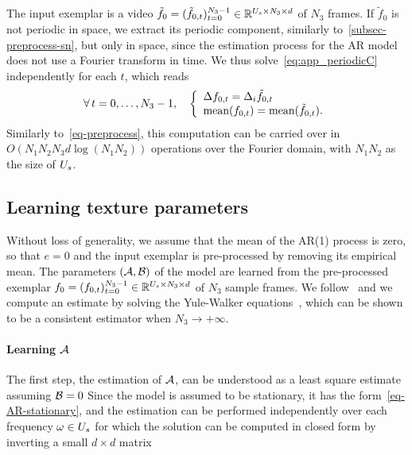 The input exemplar is a video $\tilde f_0 = (\tilde f_{0,t})_{t=0}^{N_3-1} \in \mathbb{R}^{U_s \times N_3 \times d}$ of $N_3$ frames. If $\tilde f_0$ is not periodic in space, we extract its periodic component, similarly to~\eqref{subsec-preprocess-sn}, but only in space, since the estimation process for the AR model does not use a Fourier transform in time. We thus solve~\eqref{eq:app_periodicC} independently for each $t$, which reads
\begin{align}
	\foralls t=0,\ldots,N_3-1, \quad
	\left\{
	\begin{array}{ll}
 		\Delta f_{0,t} = \Delta_i \tilde f_{0,t} \\
		 \textrm{mean}(f_{0,t}) = \textrm{mean}(\tilde f_{0,t}).
	\end{array}
	\right.
	\label{eq-preprocess-ar}
\end{align}
Similarly to~\eqref{eq-preprocess}, this computation can be carried over in $O(N_1 N_2 N_3 d \log(N_1 N_2))$ operations over the Fourier domain, with $N_1 N_2$ as the size of $U_s$.



\subsection{Learning texture parameters}


Without loss of generality, we assume that the mean of the AR(1) process is zero, so that $e=0$ and the input exemplar is pre-processed by removing its empirical mean. The parameters $(\mathcal{A},\mathcal{B})$ of the model are learned from the pre-processed exemplar $f_0 = (f_{0,t})_{t=0}^{N_3-1} \in \mathbb{R}^{U_s \times N_3 \times d}$ of $N_3$ sample frames. We follow~\cite{doretto-ijcv} and we compute an estimate by solving the Yule-Walker equations~\cite{PanditWu}, which can be shown to be a consistent estimator when $N_3 \rightarrow +\infty$.


\paragraph*{Learning $\mathcal{A}$}

The first step, the estimation of $\mathcal{A}$, can be understood as a least square estimate assuming $\mathcal{B}=0$
Since the model is assumed to be stationary, it has the form~\eqref{eq-AR-stationary}, and the estimation can be performed independently over each frequency $\omega \in U_s$
for which the solution can be computed in closed form by inverting a small $d \times d$ matrix

